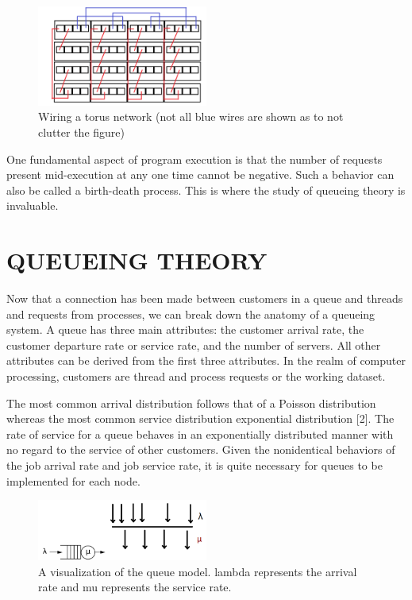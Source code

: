 \documentclass[letterpaper, 10 pt, conference]{ieeeconf}
\begin{document}
\begin{figure}[!ht] %
	\centering
	\includegraphics [width=0.5\textwidth] {torus_wiring.png} 
    \caption{Wiring a torus network (not all blue wires are shown as to not clutter the figure)}
\end{figure}


One fundamental aspect of program execution is that the number of requests present mid-execution at any one time cannot be negative.  Such a behavior can also be called a birth-death process.  This is where the study of queueing theory is invaluable. %

\section{QUEUEING THEORY}

Now that a connection has been made between customers in a queue and threads and requests from processes, we can break down the anatomy of a queueing system.  A queue has three main attributes: the customer arrival rate, the customer departure rate or service rate, and the number of servers.  All other attributes can be derived from the first three attributes.  In the realm of computer processing, customers are thread and process requests or the working dataset.

\vspace{5mm}

The most common arrival distribution follows that of a Poisson distribution whereas the most common service distribution exponential distribution [2].  The rate of service for a queue behaves in an exponentially distributed manner with no regard to the service of other customers.  Given the nonidentical behaviors of the job arrival rate and job service rate, it is quite necessary for queues to be implemented for each node.

\begin{figure}[!ht] %
	\centering
	\includegraphics [width=0.5\textwidth] {Queue_Model.png} 
    \caption{A visualization of the queue model.  lambda represents the arrival rate and mu represents the service rate.}
\end{figure}
\end{document}
